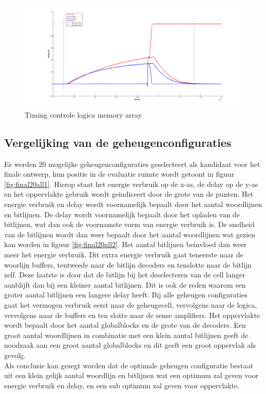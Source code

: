 \begin{figure}[!ht]
  \centering
  \includegraphics[scale=0.6]{../fig/hfdstk-timing-leescyclus.png}
  \caption{Timing controle logica memory array}
  \label{fig:leescyclus}
\end{figure} 

\subsection{Vergelijking van de geheugenconfiguraties}
Er werden 20 mogelijke geheugenconfiguraties geselecteert als kandidaat voor het finale ontwerp, hun positie in de evaluatie ruimte wordt getoont in figuur \ref{fig:final20all1}. Hierop staat het energie verbruik op de x-as, de delay op de y-as en het oppervlakte gebruik wordt geindiceert door de grote van de punten. Het energie verbruik en delay wordt voornamelijk bepaalt door het aantal woordlijnen en bitlijnen. De delay wordt voornamelijk bepaalt door het opladen van de bitlijnen, wat dan ook de voornamste vorm van energie verbruik is. De snelheid van de bitlijnen wordt dan weer bepaalt door het aantal woordlijnen wat gezien kan worden in figuur \ref{fig:final20all2}. Het aantal bitlijnen beinvloed dan weer meer het energie verbruik. Dit extra energie verbruik gaat teneerste naar de woorlijn buffers, tentweede naar de bitlijn decoders en tenslotte naar de bitlijn zelf. Deze laatste is door dat de bitlijn bij het deselecteren van de cell langer aanblijft dan bij een kleiner aantal bitlijnen. Dit is ook de reden waarom een groter aantal bitlijnen een langere delay heeft. Bij alle geheugen configuraties gaat het vermogen verbruik eerst naar de geheugecell, vervolgens naar de logica, vervolgens naar de buffers en ten slotte naar de sense amplifiers. Het oppervlakte wordt bepaalt door het aantal globalblocks en de grote van de decoders. Een groot aantal woordlijnen in combinatie met een klein aantal bitlijnen geeft de noodzaak aan een groot aantal globalblocks en dit geeft een groot oppervlak als gevolg.\\
Als conclusie kan gezegt worden dat de optimale geheugen configuratie bestaat uit een klein gelijk aantal woordlijn en bitlijnen wat een optimum zal geven voor energie verbruik en delay, en een sub optimum zal geven voor oppervlakte.


